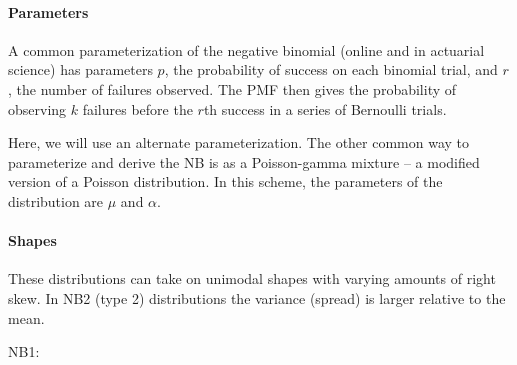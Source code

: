 \documentclass[]{book}
\let\oldparagraph\paragraph
\renewcommand{\paragraph}[1]{\oldparagraph{#1}\mbox{}}
\begin{document}
\hypertarget{parameters-5}{%
\paragraph{Parameters}\label{parameters-5}}

A common parameterization of the negative binomial (online and in actuarial science) has parameters \(p\), the probability of success on each binomial trial, and \(r\), the number of failures observed. The PMF then gives the probability of observing \(k\) failures before the \(r\)th success in a series of Bernoulli trials.

Here, we will use an alternate parameterization. The other common way to parameterize and derive the NB is as a Poisson-gamma mixture -- a modified version of a Poisson distribution. In this scheme, the parameters of the distribution are \(\mu\) and \(\alpha\).

\hypertarget{shapes-5}{%
\paragraph{Shapes}\label{shapes-5}}

These distributions can take on unimodal shapes with varying amounts of right skew. In NB2 (type 2) distributions the variance (spread) is larger relative to the mean.

NB1:
\end{document}
